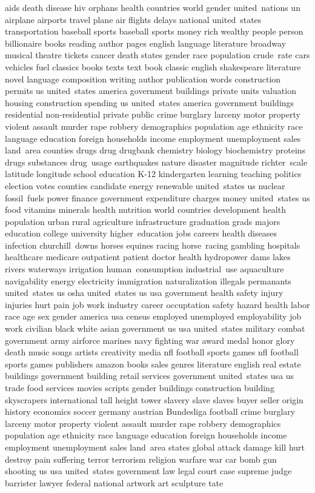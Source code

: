 aids
death
disease
hiv
orphans
health
countries
world
gender
united~nations
un
airplane
airports
travel
plane
air
flights
delays
national
united~states
transportation
baseball
sports
baseball
sports
money
rich
wealthy
people
person
billionaire
books
reading
author
pages
english
language
literature
broadway
musical
theatre
tickets
cancer
death
states
gender
race
population
crude~rate
cars
vehicles
fuel
classics
books
texts
text
book
classic
english
shakespeare
literature
novel
language
composition
writing
author
publication
words
construction
permits
us
united~states
america
government
buildings
private
units
valuation
housing
construction
spending
us
united~states
america
government
buildings
residential
non-residential
private
public
crime
burglary
larceny
motor
property
violent
assault
murder
rape
robbery
demographics
population
age
ethnicity
race
language
education
foreign
households
income
employment
unemployment
sales
land~area
counties
drugs
drug
drugbank
chemistry
biology
biochemistry
proteins
drugs
substances
drug~usage
earthquakes
nature
disaster
magnitude
richter~scale
latitude
longitude
school
education
K-12
kindergarten
learning
teaching
politics
election
votes
counties
candidate
energy
renewable
united~states
us
nuclear
fossil~fuels
power
finance
government
expenditure
charges
money
united~states
us
food
vitamins
minerals
health
nutrition
world
countries
development
health
population
urban
rural
agriculture
infrastructure
graduation
grads
majors
education
college
university
higher~education
jobs
careers
health
diseases
infection
churchill~downs
horses
equines
racing
horse~racing
gambling
hospitals
healthcare
medicare
outpatient
patient
doctor
health
hydropower
dams
lakes
rivers
waterways
irrigation
human~consumption
industrial~use
aquaculture
navigability
energy
electricity
immigration
naturalization
illegals
permanants
united~states
us
osha
united~states
us
usa
government
health
safety
injury
injuries
hurt
pain
job
work
industry
career
occuptation
safety
hazard
health
labor
race
age
sex
gender
america
usa
census
employed
unemployed
employability
job
work
civilian
black
white
asian
government
us
usa
united~states
military
combat
government
army
airforce
marines
navy
fighting
war
award
medal
honor
glory
death
music
songs
artists
creativity
media
nfl
football
sports
games
nfl
football
sports
games
publishers
amazon
books
sales
genres
literature
english
real
estate
buildings
government
building
retail
services
government
united~states
usa
us
trade
food
services
movies
scripts
gender
buildings
construction
building
skyscrapers
international
tall
height
tower
slavery
slave
slaves
buyer
seller
origin
history
economics
soccer
germany
austrian
Bundesliga
football
crime
burglary
larceny
motor
property
violent
assault
murder
rape
robbery
demographics
population
age
ethnicity
race
language
education
foreign
households
income
employment
unemployment
sales
land~area
states
global
attack
damage
kill
hurt
destroy
pain
suffering
terror
terrorism
religion
warfare
war
car
bomb
gun
shooting
us
usa
united~states
government
law
legal
court
case
supreme
judge
barrister
lawyer
federal
national
artwork
art
sculpture
tate
